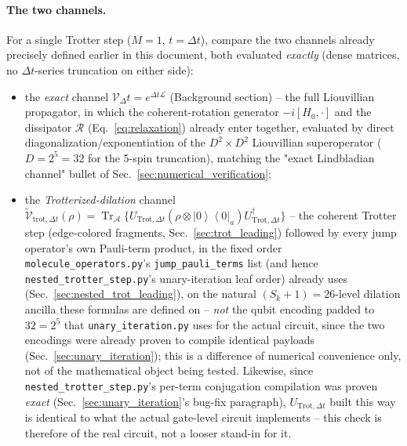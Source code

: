 \documentclass[11pt]{article}
\newcommand{\calV}{\mathcal{V}}
\newcommand{\Dt}{\Delta t}
\newcommand{\calR}{\mathcal{R}}
\newcommand{\calL}{\mathcal{L}}
\renewcommand{\ket}[1]{\left| #1 \right\rangle}
\renewcommand{\bra}[1]{\left\langle #1 \right|}
\DeclareMathOperator{\Tr}{Tr}
\begin{document}
\paragraph{The two channels.} For a single Trotter step ($M=1$, $t=\Dt$), compare the two channels already precisely defined earlier in this document, both evaluated \emph{exactly} (dense matrices, no $\Dt$-series truncation on either side):
\begin{itemize}
    \item the \emph{exact} channel $\calV_\Dt=e^{\Dt\calL}$ (Background section) -- the full Liouvillian propagator, in which the coherent-rotation generator $-i[H_0,\cdot]$ and the dissipator $\calR$ (Eq.~\eqref{eq:relaxation}) already enter together, evaluated by direct diagonalization/exponentiation of the $D^2\times D^2$ Liouvillian superoperator ($D=2^5=32$ for the 5-spin truncation), matching the "exact Lindbladian channel" bullet of Sec.~\ref{sec:numerical_verification};
    \item the \emph{Trotterized-dilation} channel $\tilde{\calV}_{\text{trot},\Dt}(\rho)=\Tr_{\mathcal A}\{U_{\text{Trot},\Dt}(\rho\otimes\ket0\bra0_a)U_{\text{Trot},\Dt}^\dagger\}$ -- the coherent Trotter step (edge-colored fragments, Sec.~\ref{sec:trot_leading}) followed by every jump operator's own Pauli-term product, in the fixed order \texttt{molecule\_operators.py}'s \texttt{jump\_pauli\_terms} list (and hence \texttt{nested\_trotter\_step.py}'s unary-iteration leaf order) already uses (Sec.~\ref{sec:nested_trot_leading}), on the natural $(S_k+1)=26$-level dilation ancilla these formulas are defined on -- \emph{not} the qubit encoding padded to $32=2^5$ that \texttt{unary\_iteration.py} uses for the actual circuit, since the two encodings were already proven to compile identical payloads (Sec.~\ref{sec:unary_iteration}); this is a difference of numerical convenience only, not of the mathematical object being tested. Likewise, since \texttt{nested\_trotter\_step.py}'s per-term conjugation compilation was proven \emph{exact} (Sec.~\ref{sec:unary_iteration}'s bug-fix paragraph), $U_{\text{Trot},\Dt}$ built this way is identical to what the actual gate-level circuit implements -- this check is therefore of the real circuit, not a looser stand-in for it.
\end{itemize}
\end{document}
